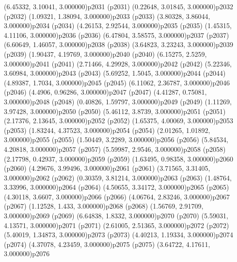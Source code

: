 \psPoint(6.45332, 3.10041, 3.000000){p2031}
\psdot(p2031)
\psPoint(0.22648, 3.01845, 3.000000){p2032}
\psdot(p2032)
\psPoint(1.09321, 1.38094, 3.000000){p2033}
\psdot(p2033)
\psPoint(3.80328, 3.86044, 3.000000){p2034}
\psdot(p2034)
\psPoint(4.26153, 2.92544, 3.000000){p2035}
\psdot(p2035)
\psPoint(1.45315, 4.11106, 3.000000){p2036}
\psdot(p2036)
\psPoint(6.47804, 3.58575, 3.000000){p2037}
\psdot(p2037)
\psPoint(6.60649, 1.46057, 3.000000){p2038}
\psdot(p2038)
\psPoint(3.64823, 3.23243, 3.000000){p2039}
\psdot(p2039)
\psPoint(1.90437, 4.19769, 3.000000){p2040}
\psdot(p2040)
\psPoint(6.15275, 2.5259, 3.000000){p2041}
\psdot(p2041)
\psPoint(2.71466, 4.29928, 3.000000){p2042}
\psdot(p2042)
\psPoint(5.22346, 3.60984, 3.000000){p2043}
\psdot(p2043)
\psPoint(5.69252, 1.5045, 3.000000){p2044}
\psdot(p2044)
\psPoint(4.89387, 1.7034, 3.000000){p2045}
\psdot(p2045)
\psPoint(6.11062, 2.36787, 3.000000){p2046}
\psdot(p2046)
\psPoint(4.4906, 0.96286, 3.000000){p2047}
\psdot(p2047)
\psPoint(4.41287, 0.75081, 3.000000){p2048}
\psdot(p2048)
\psPoint(0.40826, 1.59797, 3.000000){p2049}
\psdot(p2049)
\psPoint(1.11269, 3.97428, 3.000000){p2050}
\psdot(p2050)
\psPoint(5.46112, 3.8739, 3.000000){p2051}
\psdot(p2051)
\psPoint(2.17376, 2.13645, 3.000000){p2052}
\psdot(p2052)
\psPoint(1.65375, 4.00069, 3.000000){p2053}
\psdot(p2053)
\psPoint(1.83244, 4.37523, 3.000000){p2054}
\psdot(p2054)
\psPoint(2.01265, 1.01892, 3.000000){p2055}
\psdot(p2055)
\psPoint(1.50449, 3.2289, 3.000000){p2056}
\psdot(p2056)
\psPoint(5.84534, 4.20818, 3.000000){p2057}
\psdot(p2057)
\psPoint(5.59987, 2.9546, 3.000000){p2058}
\psdot(p2058)
\psPoint(2.17798, 0.42937, 3.000000){p2059}
\psdot(p2059)
\psPoint(1.63495, 0.98358, 3.000000){p2060}
\psdot(p2060)
\psPoint(4.29676, 3.99496, 3.000000){p2061}
\psdot(p2061)
\psPoint(3.71565, 3.31405, 3.000000){p2062}
\psdot(p2062)
\psPoint(0.30359, 3.81214, 3.000000){p2063}
\psdot(p2063)
\psPoint(1.48764, 3.33996, 3.000000){p2064}
\psdot(p2064)
\psPoint(4.50655, 3.34172, 3.000000){p2065}
\psdot(p2065)
\psPoint(4.30118, 3.6607, 3.000000){p2066}
\psdot(p2066)
\psPoint(4.06764, 2.83246, 3.000000){p2067}
\psdot(p2067)
\psPoint(1.12528, 1.433, 3.000000){p2068}
\psdot(p2068)
\psPoint(1.56769, 2.91709, 3.000000){p2069}
\psdot(p2069)
\psPoint(6.64838, 1.8332, 3.000000){p2070}
\psdot(p2070)
\psPoint(5.59031, 4.13571, 3.000000){p2071}
\psdot(p2071)
\psPoint(2.61005, 2.51365, 3.000000){p2072}
\psdot(p2072)
\psPoint(5.40019, 1.34873, 3.000000){p2073}
\psdot(p2073)
\psPoint(4.40213, 1.19334, 3.000000){p2074}
\psdot(p2074)
\psPoint(4.37078, 4.23459, 3.000000){p2075}
\psdot(p2075)
\psPoint(3.64722, 4.17611, 3.000000){p2076}
